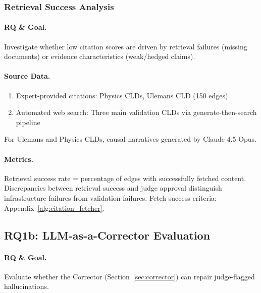 \subsubsection{Retrieval Success Analysis}
\label{sec:retrieval_success}

\paragraph{RQ \& Goal.}
Investigate whether low citation scores are driven by retrieval failures (missing documents) or evidence characteristics (weak/hedged claims).

\paragraph{Source Data.}
\begin{enumerate}[noitemsep]
    \item Expert-provided citations: Physics CLDs, Ulemans CLD (150 edges)
    \item Automated web search: Three main validation CLDs via generate-then-search pipeline
\end{enumerate}
For Ulemans and Physics CLDs, causal narratives generated by Claude 4.5 Opus.

\paragraph{Metrics.}
Retrieval success rate = percentage of edges with successfully fetched content. Discrepancies between retrieval success and judge approval distinguish infrastructure failures from validation failures. Fetch success criteria: Appendix~\ref{alg:citation_fetcher}.

\subsection{RQ1b: LLM-as-a-Corrector Evaluation}
\label{sec:rq1b}
\label{sec:rq1b_experiments}

\paragraph{RQ \& Goal.}
Evaluate whether the Corrector (Section~\ref{sec:corrector}) can repair judge-flagged hallucinations.

